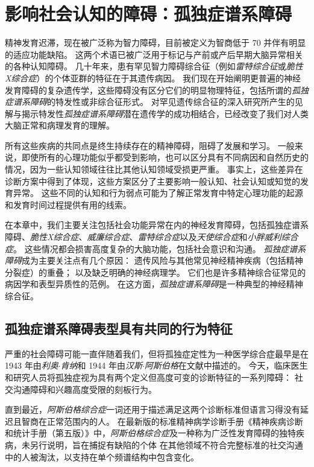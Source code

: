 \chapter{影响社会认知的障碍：孤独症谱系障碍} \label{chap:chap62}

精神发育迟滞，现在被广泛称为智力障碍，目前被定义为智商低于 70 并伴有明显的适应功能缺陷。
这两个术语已被广泛用于标记与产前或产后早期大脑异常相关的各种认知障碍。
几十年来，患有罕见智力障碍综合征（例如\textit{雷特综合征}或\textit{脆性X综合症}）的个体亚群的特征在于其遗传病因。
我们现在开始阐明更普遍的神经发育障碍的复杂遗传学，这些障碍没有区分它们的明显物理特征，包括所谓的\textit{孤独症谱系障碍}的特发性或非综合征形式。
对罕见遗传综合征的深入研究所产生的见解与揭示特发性\textit{孤独症谱系障碍}潜在遗传学的成功相结合，已经改变了我们对人类大脑正常和病理发育的理解。


所有这些疾病的共同点是终生持续存在的精神障碍，阻碍了发展和学习。
一般来说，即使所有的心理功能似乎都受到影响，也可以区分具有不同病因和自然历史的情况，因为一些认知领域往往比其他认知领域受损更严重。
事实上，这些差异在诊断方案中得到了体现，这些方案区分了主要影响一般认知、社会认知或知觉的发育异常。
这些不同的认知和行为弱点可能为了解正常发育中特定心理功能的起源和发育时间过程提供有用的线索。


在本章中，我们主要关注包括社会功能异常在内的神经发育障碍，包括孤独症谱系障碍、\textit{脆性X综合症}、\textit{威廉综合症}、\textit{雷特综合症}以及\textit{天使综合症}和\textit{小胖威利综合症}。
这些情况都会损害高度复杂的大脑功能，包括社会意识和沟通。
\textit{孤独症谱系障碍}成为主要关注点有几个原因：
遗传风险与其他常见神经精神疾病（包括精神分裂症）的重叠；
以及缺乏明确的神经病理学。
它们也是许多精神综合征常见的病因学和表型异质性的范例。
在这方面，\textit{孤独症谱系障碍}是一种典型的神经精神综合征。



\section{孤独症谱系障碍表型具有共同的行为特征}

严重的社会障碍可能一直伴随着我们，但将孤独症定性为一种医学综合症最早是在 1943 年由\textit{利奥$\cdot$肯纳}和 1944 年由\textit{汉斯$\cdot$阿斯伯格}在文献中描述的。
今天，临床医生和研究人员将孤独症视为具有两个定义但高度可变的诊断特征的一系列障碍：
社交沟通障碍和兴趣高度受限的刻板行为。


直到最近，\textit{阿斯伯格综合症}一词还用于描述满足这两个诊断标准但语言习得没有延迟且智商在正常范围内的人。
在最新版的标准精神病学诊断手册《精神疾病诊断和统计手册（第五版）》中，\textit{阿斯伯格综合症}及一种称为广泛性发育障碍的独特疾病，未另行说明，旨在捕捉有缺陷的个体 在其他领域不符合完整标准的社交沟通中的人被淘汰，以支持在单个频谱结构中包含变化。


